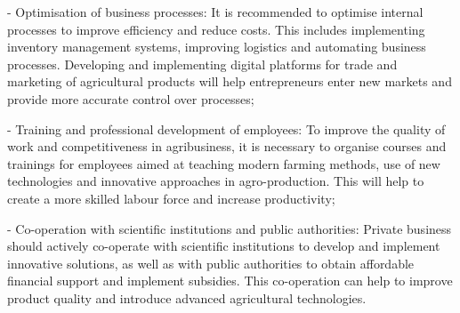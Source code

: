 \begin{multicols}{2}
- Optimisation of business processes: It is recommended to optimise
internal processes to improve efficiency and reduce costs. This includes
implementing inventory management systems, improving logistics and
automating business processes. Developing and implementing digital
platforms for trade and marketing of agricultural products will help
entrepreneurs enter new markets and provide more accurate control over
processes;

- Training and professional development of employees: To improve the
quality of work and competitiveness in agribusiness, it is necessary to
organise courses and trainings for employees aimed at teaching modern
farming methods, use of new technologies and innovative approaches in
agro-production. This will help to create a more skilled labour force
and increase productivity;

- Co-operation with scientific institutions and public authorities:
Private business should actively co-operate with scientific institutions
to develop and implement innovative solutions, as well as with public
authorities to obtain affordable financial support and implement
subsidies. This co-operation can help to improve product quality and
introduce advanced agricultural technologies.
\end{multicols}


